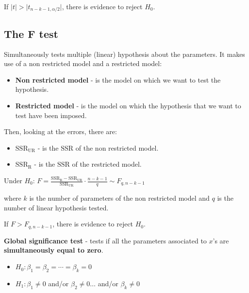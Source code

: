 \documentclass[10pt, a4paper, landscape]{article}
\newcommand{\SSR}{\mathrm{SSR}}
\begin{document}
\begin{multicols}{3}
		If $\lvert t \rvert > \lvert t_{n - k - 1, \alpha/2} \rvert$, there is evidence to reject $H_{0}$.
		
		\subsection*{The F test}
		
		Simultaneously tests multiple (linear) hypothesis about the parameters. It makes use of a non restricted model and a restricted model:
		
		\begin{itemize}[leftmargin=*]
			\item \textbf{Non restricted model} - is the model on which we want to test the hypothesis.
			\item \textbf{Restricted model} - is the model on which the hypothesis that we want to test have been imposed.
		\end{itemize}
		
		Then, looking at the errors, there are:
		
		\begin{itemize}[leftmargin=*]
			\item \textbf{$\SSR_{\mathrm{UR}}$} - is the $\SSR$ of the non restricted model.
			\item \textbf{$\SSR_{\mathrm{R}}$} - is the $\SSR$ of the restricted model.
		\end{itemize}
		
		\begin{center}
			Under $H_{0}$: \quad $F = \frac{\SSR_{\mathrm{R}}- \SSR_{\mathrm{UR}}}{\SSR_{\mathrm{UR}}} \cdot \frac{n - k - 1}{q} \sim F_{q, n - k - 1}$
		\end{center}
		
		where $k$ is the number of parameters of the non restricted model and $q$ is the number of linear hypothesis tested.
		
		If $F > F_{q, n - k - 1}$, there is evidence to reject $H_{0}$.
		
		\textbf{Global significance test} - tests if all the parameters associated to $x$'s are \textbf{simultaneously equal to zero}.
		
		\begin{itemize}[leftmargin=*]
			\item $H_{0}: \beta_{1} = \beta_{2} = \cdots = \beta_{k} = 0$
			\item $H_{1}: \beta_{1} \neq 0$ and/or $\beta_{2} \neq 0 \ldots$ and/or $\beta_{k} \neq 0$
		\end{itemize}
		

\end{multicols}
\end{document}
